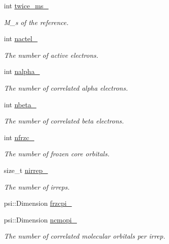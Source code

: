 \begin{DoxyCompactItemize}
int \mbox{\hyperlink{classforte_1_1_selected_c_i_method_a1ec4a746f2a3a77eafe6541cc80573db}{twice\+\_\+ms\+\_\+}}
\begin{DoxyCompactList}\small\item\em M\+\_\+s of the reference. \end{DoxyCompactList}\item 
int \mbox{\hyperlink{classforte_1_1_selected_c_i_method_ae9bc1dcc63d98b08ad4cd4c461859715}{nactel\+\_\+}}
\begin{DoxyCompactList}\small\item\em The number of active electrons. \end{DoxyCompactList}\item 
int \mbox{\hyperlink{classforte_1_1_selected_c_i_method_afab100d031b9bd421a61124484682b53}{nalpha\+\_\+}}
\begin{DoxyCompactList}\small\item\em The number of correlated alpha electrons. \end{DoxyCompactList}\item 
int \mbox{\hyperlink{classforte_1_1_selected_c_i_method_a3b42f7ef68facba5cc517d9285182ab6}{nbeta\+\_\+}}
\begin{DoxyCompactList}\small\item\em The number of correlated beta electrons. \end{DoxyCompactList}\item 
int \mbox{\hyperlink{classforte_1_1_selected_c_i_method_ad1bfe23d79bf827e54d5cf7bbeb4326f}{nfrzc\+\_\+}}
\begin{DoxyCompactList}\small\item\em The number of frozen core orbitals. \end{DoxyCompactList}\item 
size\+\_\+t \mbox{\hyperlink{classforte_1_1_selected_c_i_method_ac98e919e2c06d50a238e9193de155e89}{nirrep\+\_\+}}
\begin{DoxyCompactList}\small\item\em The number of irreps. \end{DoxyCompactList}\item 
psi\+::\+Dimension \mbox{\hyperlink{classforte_1_1_selected_c_i_method_a360567df9c2db25c91bb001fb086c836}{frzcpi\+\_\+}}
\item 
psi\+::\+Dimension \mbox{\hyperlink{classforte_1_1_selected_c_i_method_a07840a0a9679cfba98beec1fab217d9d}{ncmopi\+\_\+}}
\begin{DoxyCompactList}\small\item\em The number of correlated molecular orbitals per irrep. \end{DoxyCompactList}\item 

\end{DoxyCompactItemize}
